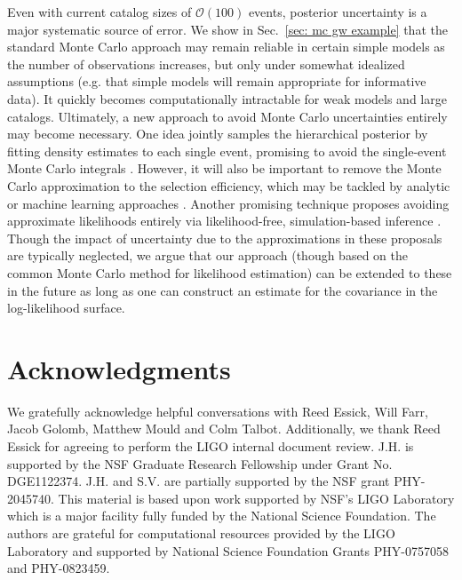 Even with current catalog sizes of $\mathcal{O}(100)$ events, posterior uncertainty is a major systematic source of error. We show in Sec.~\ref{sec: mc gw example} that the standard Monte Carlo approach may remain reliable in certain simple models as the number of observations increases, but only under somewhat idealized assumptions (e.g. that simple models will remain appropriate for informative data). It quickly becomes computationally intractable for weak models and large catalogs. Ultimately, a new approach to avoid Monte Carlo uncertainties entirely may become necessary. One idea jointly samples the hierarchical posterior by fitting density estimates to each single event, promising to avoid the single-event Monte Carlo integrals \citep{Rinaldi:2021bhm,Callister:2022qwb,Hussain:2024qzl,Mancarella:2025uat}. However, it will also be important to remove the Monte Carlo approximation to the selection efficiency, which may be tackled by analytic or machine learning approaches \citep{Lorenzo-Medina:2024opt, Talbot:2020oeu, Gerosa:2020pgy, Callister:2024qyq}. Another promising technique proposes avoiding approximate likelihoods entirely via likelihood-free, simulation-based inference \citep{Leyde:2023iof}.
Though the impact of uncertainty due to the approximations in these proposals are typically neglected, we argue that our approach (though based on the common Monte Carlo method for likelihood estimation) can be extended to these in the future as long as one can construct an estimate for the covariance in the log-likelihood surface. 

\section{Acknowledgments}

We gratefully acknowledge helpful conversations with Reed Essick, Will Farr, Jacob Golomb, Matthew Mould and Colm Talbot. 
%
Additionally, we thank Reed Essick for agreeing to perform the LIGO internal document review.
%
J.H. is supported by the NSF Graduate Research Fellowship under Grant No. DGE1122374.
%
J.H. and S.V. are partially supported by the NSF grant PHY-2045740.
%
This material is based upon work supported by NSF's LIGO Laboratory which is a major facility fully funded by the National Science Foundation.
%
The authors are grateful for computational resources provided by the LIGO Laboratory and supported by National Science Foundation Grants PHY-0757058 and PHY-0823459.